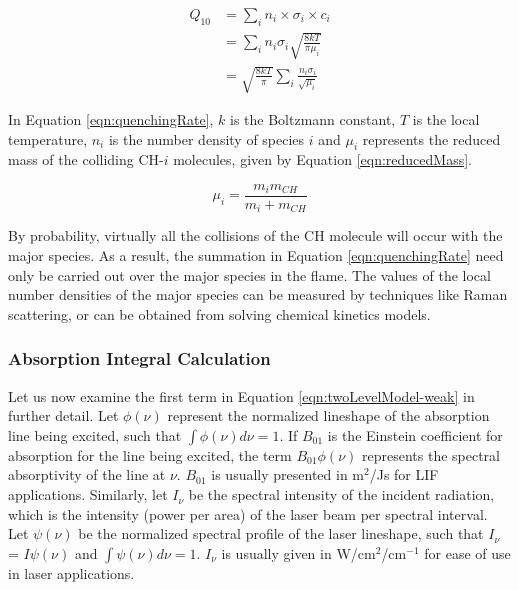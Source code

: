 \begin{align}
  Q_{10} &= \sum_i n_i \times \sigma_i \times c_i \nonumber \\
  & = \sum_i n_i \sigma_i \sqrt{\frac{8kT}{\pi\mu_i}} \nonumber \\
  & = \sqrt{\frac{8kT}{\pi}} \sum_i \frac{n_i \sigma_i}{\sqrt{\mu_i}}
  \label{eqn:quenchingRate}
\end{align}

In Equation \ref{eqn:quenchingRate}, \(k\) is the Boltzmann constant, \(T\) is the local temperature, \(n_i\) is the number density of species \(i\) and \(\mu_i\) represents the reduced mass of the colliding CH-\(i\) molecules, given by Equation \ref{eqn:reducedMass}.

\begin{equation}
  \mu_i = \frac{ m_i m_{CH} }{ m_i + m_{CH} }
  \label{eqn:reducedMass}
\end{equation}

By probability, virtually all the collisions of the CH molecule will occur with the major species.
As a result, the summation in Equation \ref{eqn:quenchingRate} need only be carried out over the major species in the flame.
The values of the local number densities of the major species can be measured by techniques like Raman scattering, or can be obtained from solving chemical kinetics models.

\subsubsection{Absorption Integral Calculation}
\label{subsubsec:basic-model-absorption-integral-calculation}

Let us now examine the first term in Equation \ref{eqn:twoLevelModel-weak} in further detail.
Let \(\phi(\nu)\) represent the normalized lineshape of the absorption line being excited, such that \(\int \phi(\nu) d\nu = 1\).
If \(B_{01}\) is the Einstein coefficient for absorption for the line being excited, the term \(B_{01}\phi(\nu)\) represents the spectral absorptivity of the line at \(\nu\).
\(B_{01}\) is usually presented in m\(^2\)/Js for LIF applications.
Similarly, let \(I_\nu\) be the spectral intensity of the incident radiation, which is the intensity (power per area) of the laser beam per spectral interval.
Let \(\psi(\nu)\) be the normalized spectral profile of the laser lineshape, such that \(I_\nu\) = \(I \psi(\nu)\) and \(\int \psi(\nu) d\nu = 1\).
\(I_\nu\) is usually given in W/cm\(^2\)/cm\(^{-1}\) for ease of use in laser applications.

